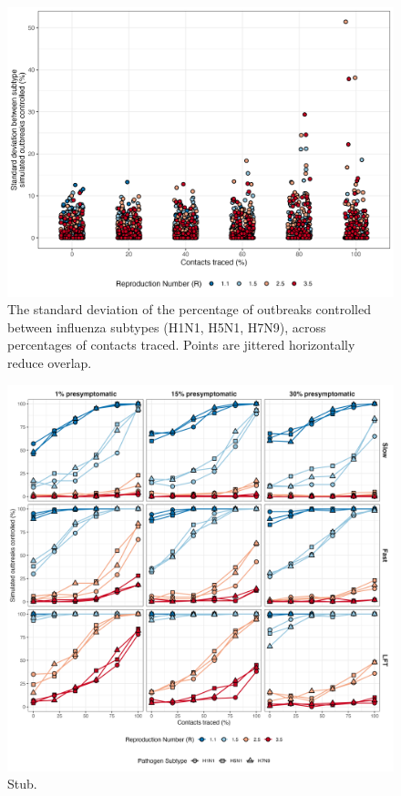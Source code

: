 \documentclass{article}
\begin{document}
\begin{figure}[ht]
\centering
\includegraphics[width=\textwidth]{../plots/prop_outbreak_control_var_reproduction_number.png}
\caption{The standard deviation of the percentage of outbreaks controlled between influenza subtypes (H1N1, H5N1, H7N9), across percentages of contacts traced. Points are jittered horizontally reduce overlap.}
\label{fig:prop-outbreak-control-var-R}
\end{figure}

\begin{figure}[ht]
\centering
\includegraphics[width=\textwidth]{../plots/prop_outbreak_control_prop_presym_iso.png}
\caption{Stub.}
\label{fig:prop-outbreak-control-prop-presym-iso}
\end{figure}
\end{document}
